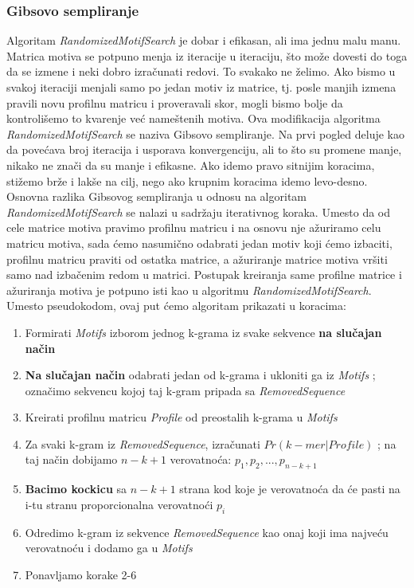 \subsubsection{Gibsovo sempliranje}
Algoritam \textit{RandomizedMotifSearch} je dobar i efikasan, ali ima jednu malu manu. Matrica motiva se potpuno menja iz iteracije u iteraciju, što može dovesti do toga da se izmene i neki dobro izračunati redovi. To svakako ne želimo. Ako bismo u svakoj iteraciji menjali samo po jedan motiv iz matrice, tj. posle manjih izmena pravili novu profilnu matricu i proveravali skor, mogli bismo bolje da kontrolišemo to kvarenje već nameštenih motiva. Ova modifikacija algoritma \textit{RandomizedMotifSearch} se naziva Gibsovo sempliranje. Na prvi pogled deluje kao da povećava broj iteracija i usporava konvergenciju, ali to što su promene manje, nikako ne znači da su manje i efikasne. Ako idemo pravo sitnijim koracima, stižemo brže i lakše na cilj, nego ako krupnim koracima idemo levo-desno. 
Osnovna razlika Gibsovog sempliranja u odnosu na algoritam \textit{RandomizedMotifSearch} se nalazi u sadržaju iterativnog koraka. Umesto da od cele matrice motiva pravimo profilnu matricu i na osnovu nje ažuriramo celu matricu motiva, sada ćemo nasumično odabrati jedan motiv koji ćemo izbaciti, profilnu matricu praviti od ostatka matrice, a ažuriranje matrice motiva vršiti samo nad izbačenim redom u matrici. Postupak kreiranja same profilne matrice i ažuriranja motiva je potpuno isti kao u algoritmu \textit{RandomizedMotifSearch}. Umesto pseudokodom, ovaj put ćemo algoritam prikazati u koracima:

\begin{enumerate}
    \item Formirati \textit{Motifs} izborom jednog k-grama iz svake sekvence \textbf{na slučajan način}
    \item \textbf{Na slučajan način} odabrati jedan od k-grama i ukloniti ga iz \textit{Motifs} ; označimo sekvencu kojoj taj k-gram pripada sa \textit{RemovedSequence}
    \item Kreirati profilnu matricu \textit{Profile} od preostalih k-grama u \textit{Motifs}
    \item Za svaki k-gram iz \textit{RemovedSequence}, izračunati $Pr(k-mer|Profile)$ ; na taj način dobijamo $n-k+1$ verovatnoća: $p_1, p_2, ..., p_{n-k+1}$
    \item \textbf{Bacimo kockicu} sa $n-k+1$ strana kod koje je verovatnoća da će pasti na i-tu stranu proporcionalna verovatnoći $p_i$
    \item Odredimo k-gram iz sekvence \textit{RemovedSequence} kao onaj koji ima najveću verovatnoću i dodamo ga u \textit{Motifs}
    \item Ponavljamo korake 2-6
\end{enumerate}

